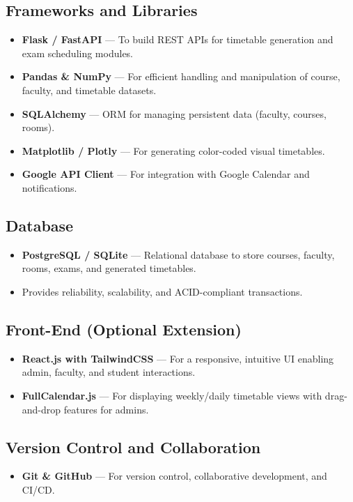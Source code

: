 \documentclass[12pt]{article}
\begin{document}
\subsection{Frameworks and Libraries}
\begin{itemize}
    \item \textbf{Flask / FastAPI} --- To build REST APIs for timetable generation and
    exam scheduling modules.
    \item \textbf{Pandas \& NumPy} --- For efficient handling and manipulation of course,
    faculty, and timetable datasets.
    \item \textbf{SQLAlchemy} --- ORM for managing persistent data (faculty, courses, rooms).
    \item \textbf{Matplotlib / Plotly} --- For generating color-coded visual timetables.
    \item \textbf{Google API Client} --- For integration with Google Calendar and notifications.
\end{itemize}

\subsection{Database}
\begin{itemize}
    \item \textbf{PostgreSQL / SQLite} --- Relational database to store courses, faculty, rooms,
    exams, and generated timetables. 
    \item Provides reliability, scalability, and ACID-compliant transactions.
\end{itemize}

\subsection{Front-End (Optional Extension)}
\begin{itemize}
    \item \textbf{React.js with TailwindCSS} --- For a responsive, intuitive UI enabling
    admin, faculty, and student interactions.
    \item \textbf{FullCalendar.js} --- For displaying weekly/daily timetable views with
    drag-and-drop features for admins.
\end{itemize}

\subsection{Version Control and Collaboration}
\begin{itemize}
    \item \textbf{Git \& GitHub} --- For version control, collaborative development, and CI/CD.
\end{itemize}
\end{document}
